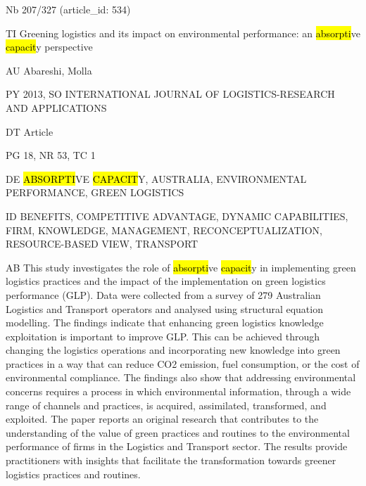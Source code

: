 \documentclass[a4paper]{article}
\begin{document}
\vspace*{-2cm}
Nb \tabto{0cm}207/327 (article\_id: 534)\par
TI \tabto{0cm}Greening logistics and its impact on environmental performance: an \hl{absorpti}ve \hl{capacit}y perspective\par
AU \tabto{0cm}Abareshi, Molla\par
PY \tabto{0cm}2013, SO INTERNATIONAL JOURNAL OF LOGISTICS-RESEARCH AND APPLICATIONS\par
DT \tabto{0cm}Article\par
PG \tabto{0cm}18, NR 53, TC 1\par
DE \tabto{0cm}\hl{ABSORPTI}VE \hl{CAPACIT}Y, AUSTRALIA, ENVIRONMENTAL PERFORMANCE, GREEN LOGISTICS\par
ID \tabto{0cm}BENEFITS, COMPETITIVE ADVANTAGE, DYNAMIC CAPABILITIES, FIRM, KNOWLEDGE, MANAGEMENT, RECONCEPTUALIZATION, RESOURCE-BASED VIEW, TRANSPORT\par
AB \tabto{0cm}This study investigates the role of \hl{absorpti}ve \hl{capacit}y in implementing green logistics practices and the impact of the implementation on green logistics performance (GLP). Data were collected from a survey of 279 Australian Logistics and Transport operators and analysed using structural equation modelling. The findings indicate that enhancing green logistics knowledge exploitation is important to improve GLP. This can be achieved through changing the logistics operations and incorporating new knowledge into green practices in a way that can reduce CO2 emission, fuel consumption, or the cost of environmental compliance. The findings also show that addressing environmental concerns requires a process in which environmental information, through a wide range of channels and practices, is acquired, assimilated, transformed, and exploited. The paper reports an original research that contributes to the understanding of the value of green practices and routines to the environmental performance of firms in the Logistics and Transport sector. The results provide practitioners with insights that facilitate the transformation towards greener logistics practices and routines.\par
\clearpage
\end{document}
